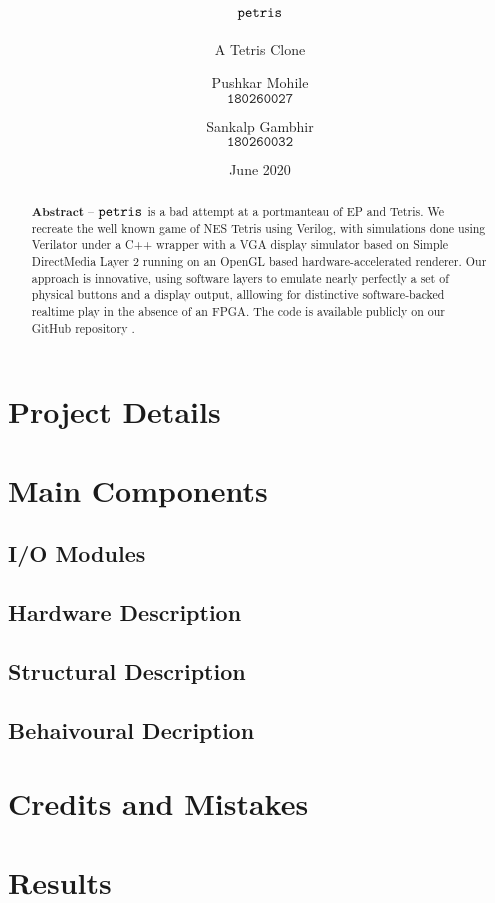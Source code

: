 \documentclass[10pt, a4paper, egregdoesnotlikesansseriftitles]{scrartcl}
\title{$\texttt{petris}$}
\subtitle{A Tetris Clone}
\author{
    Pushkar Mohile \\
    $\texttt{180260027}$
    \and
    Sankalp Gambhir \\
    $\texttt{180260032}$
    }
\date{June 2020}
\begin{document}
\maketitle

\begin{abstract}
    \centering
    $\textbf{Abstract --}$
    $\texttt{petris}$ is a bad attempt at a portmanteau of 
    EP and Tetris. We recreate the well known game of NES Tetris \cite{tetris}
    using Verilog, with simulations done using Verilator \cite{verilator} under
    a C++ wrapper with a VGA display simulator based on Simple DirectMedia Layer 2
    \cite{sdl2} running on an OpenGL based hardware-accelerated renderer. Our approach
    is innovative, using software layers to emulate nearly perfectly a set of
    physical buttons and a display output, alllowing for distinctive software-backed
    realtime play in the absence of an FPGA. The code is available publicly on our 
    GitHub repository \cite{petrisgit}.

\end{abstract}

  
\section{Project Details}


\section{Main Components}
\subsection{I/O Modules}

\subsection{Hardware Description}
\subsection{Structural Description }
\subsection{Behaivoural Decription}


\section{Credits and Mistakes}


\section{Results}

\end{document}
